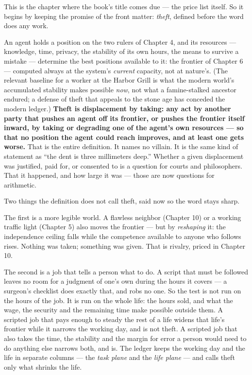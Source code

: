 


This is the chapter where the book's title comes due --- the price list
itself. So it begins by keeping the
promise of the front matter: \emph{theft}, defined before the word does any
work.

An agent holds a position on the two rulers of Chapter 4, and its
resources --- knowledge, time, privacy, the stability of its own hours,
the means to survive a mistake ---
determine the best positions available to it: the frontier of
Chapter 6 --- computed always at the system's \emph{current} capacity, not at
nature's. (The relevant baseline for a worker at the Harbor Grill is
what the modern world's accumulated stability makes possible \emph{now},
not what a famine-stalked ancestor endured; a defense of theft that
appeals to the stone age has conceded the modern ledger.) \textbf{Theft is displacement by taking: any act by another party that
pushes an agent off its frontier, or pushes the frontier itself
inward, by taking or degrading one of the agent's own resources --- so
that no position the agent could reach improves, and at least one
gets worse.} That is the entire definition. It names no villain. It is
the same kind of statement as ``the dent is three millimeters deep.''
Whether a given displacement was justified, paid for, or consented to
is a question for courts and philosophers. That it happened, and how
large it was --- those are now questions for arithmetic.

Two things the definition does not call theft, said now so the word
stays sharp.

The first is a more legible world. A flawless neighbor (Chapter 10) or
a working traffic light (Chapter 5) also moves the frontier --- but by
\emph{reshaping} it: the independence ceiling falls while the competence
available to anyone who follows rises. Nothing was taken; something
was given. That is rivalry, priced in Chapter 10.

The second is a job that tells a person what to do. A script that must
be followed leaves no room for a judgment of one's own during the
hours it covers --- a surgeon's checklist does exactly that, and robs no
one. So the test is not run on the hours of the job. It is run on the
whole life: the hours sold, and what the wage, the security and the
remaining time make possible outside them. A scripted job that pays
enough to steady the rest of a life widens that life's frontier while
it narrows the working day, and is not theft. A scripted job that also
takes the time, the stability and the margin for error a person would
need to do anything else narrows both, and is. The ledger keeps the
working day and the life in separate columns --- the \emph{task plane} and
the \emph{life plane} --- and calls theft only what shrinks the life.

